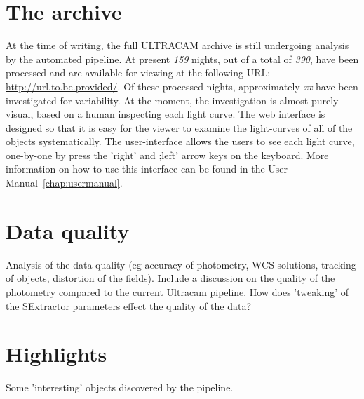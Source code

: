 \section{The archive} 

At the time of writing, the full ULTRACAM archive is still undergoing analysis by the automated pipeline. At present \emph{159} nights, out of a total of \emph{390}, have been processed and are available for viewing at the following URL: \url{http://url.to.be.provided/}. Of these processed nights, approximately \emph{xx} have been investigated for variability. At the moment, the investigation is almost purely visual, based on a human inspecting each light curve. The web interface is designed so that it is easy for the viewer to examine the light-curves of all of the objects systematically. The user-interface allows the users to see each light curve, one-by-one by press the 'right' and ;left'  arrow keys on the keyboard. More information on how to use this interface can be found in the User Manual~\ref{chap:usermanual}. 

\section{Data quality}

Analysis of the data quality (eg accuracy of photometry, WCS solutions, tracking of objects, distortion of the fields). Include a discussion on the quality of the photometry compared to the current Ultracam pipeline. How does 'tweaking' of the SExtractor parameters effect the quality of the data? 

\section{Highlights}

Some 'interesting' objects discovered by the pipeline.


